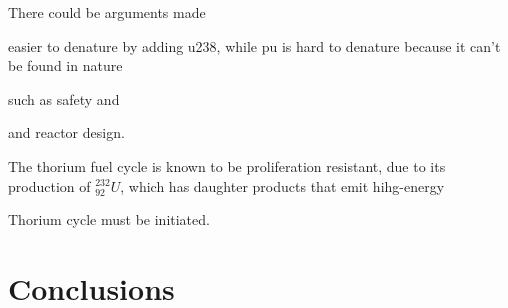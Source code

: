 \documentclass{article}
\newcommand{\utwo}{$^{232}_{92}U$}
\begin{document}
There could be arguments made 

easier to denature \cite{kang_u-232_2001} by adding u238, while
pu is hard to denature because it can't be found in nature



such as safety and 


and reactor design.


The thorium fuel cycle is known to be proliferation
resistant, due to its production of \utwo, which
has daughter products that emit hihg-energy 


Thorium cycle must be initiated.

\chapter{Conclusions}


\appendix*






\end{document}
